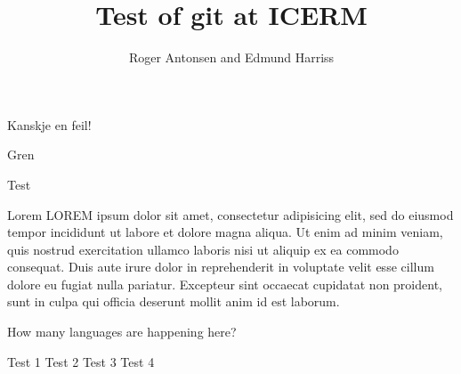 \documentclass[12pt,a4paper]{article}
\author{Roger Antonsen and Edmund Harriss}
\title{Test of git at ICERM}
\begin{document}
\maketitle

Kanskje en feil!

Gren

Test

Lorem LOREM ipsum dolor sit amet, consectetur adipisicing elit, sed do eiusmod tempor incididunt ut labore et dolore magna aliqua. Ut enim ad minim veniam, quis nostrud exercitation ullamco laboris nisi ut aliquip ex ea commodo consequat. Duis aute irure dolor in reprehenderit in voluptate velit esse cillum dolore eu fugiat nulla pariatur. Excepteur sint occaecat cupidatat non proident, sunt in culpa qui officia deserunt mollit anim id est laborum.

How many languages are happening here?

Test 1
Test 2
Test 3
Test 4
\end{document}
